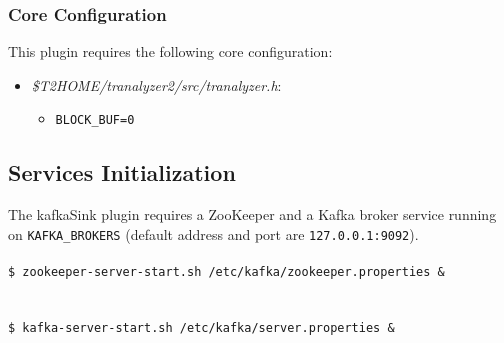\documentclass[documentation]{subfiles}
\begin{document}
\subsubsection{Core Configuration}
This plugin requires the following core configuration:
\begin{itemize}
    \item {\em \$T2HOME/tranalyzer2/src/tranalyzer.h}:
        \begin{itemize}
            \item {\tt BLOCK\_BUF=0}
        \end{itemize}
\end{itemize}

\subsection{Services Initialization}

The kafkaSink plugin requires a ZooKeeper and a Kafka broker service running on {\tt KAFKA\_BROKERS} (default address and port are {\tt 127.0.0.1:9092}).\\

\noindent
{\tt \color{blue}{\# Start the ZooKeeper server and send it to the background}}\\
{\tt \$ zookeeper-server-start.sh /etc/kafka/zookeeper.properties \&}\\
\\
{\tt \color{blue}{\# Start the Kafka server and send it to the background}}\\
{\tt \$ kafka-server-start.sh /etc/kafka/server.properties \&}\\

\clearpage
\end{document}
